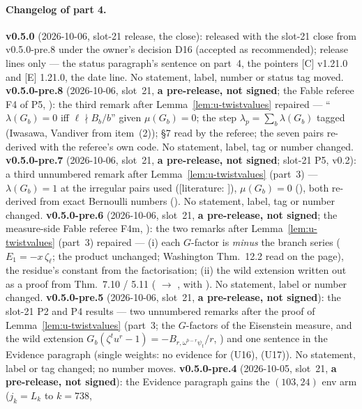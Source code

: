 \documentclass[11pt]{article}
\newcommand{\LIT}[1]{\textsf{[literature: #1]}}   %
\begin{document}
\paragraph{Changelog of part 4.} \textbf{v0.5.0} (2026-10-06, slot-21 release, the close): released with the slot-21 close from v0.5.0-pre.8 under the owner's decision D16
(accepted as recommended); release lines only --- the status paragraph's sentence on part~4, the pointers [C] v1.21.0 and [E] 1.21.0, the date line. No statement, label, number or status tag moved.
\textbf{v0.5.0-pre.8} (2026-10-06, slot~21, \textbf{a pre-release, not signed}; the Fable referee F4 of P5, ):
the third remark after Lemma~\ref{lem:u-twistvalues} repaired --- ``$\lambda(G_b)=0$ iff $\ell\nmid B_b/b$'' \PROVED{} given $\mu(G_b)=0$; the step $\lambda_p=\sum_b\lambda(G_b)$ tagged \STD{} (Iwasawa, Vandiver
from \cite{hho} item~(2)); \cite{hho} \S7 read by the referee; the seven pairs re-derived with the referee's own code. No statement, label, tag or number changed.
\textbf{v0.5.0-pre.7} (2026-10-06, slot~21, \textbf{a pre-release, not signed}; slot-21 P5,  v0.2): a third
unnumbered remark after Lemma~\ref{lem:u-twistvalues} (part~3) --- $\lambda(G_b)=1$ at the irregular pairs used (\LIT{\cite{hho}}), $\mu(G_b)=0$ (), both
re-derived from exact Bernoulli numbers (\COMP). No statement, label, tag or number changed. \textbf{v0.5.0-pre.6} (2026-10-06, slot~21, \textbf{a pre-release, not signed}; the measure-side Fable referee F4m,
): the two remarks after Lemma~\ref{lem:u-twistvalues} (part~3) repaired --- (i) each $G$-factor is \emph{minus} the branch
series ($E_1=-x\,\zeta_\ell$; the product unchanged; Washington Thm.~12.2 read on the page), the residue's constant \PROVED{} from the factorisation; (ii) the wild extension written out as a proof
from Thm.~7.10 / 5.11 (\COMP{} $\to$ \PROVED, with \COMP). No statement, label or number changed. \textbf{v0.5.0-pre.5} (2026-10-06, slot~21, \textbf{a pre-release, not signed}): the slot-21 P2 and P4 results --- two unnumbered remarks after the proof of
Lemma~\ref{lem:u-twistvalues} (part~3; the $G$-factors of the Eisenstein measure, and the wild extension $G_b(\zeta^{t}u^{r}-1)=-B_{r,\omega^{b-r}\psi_t}/r$, \COMP) and one sentence in the Evidence
paragraph (single weights: no evidence for (U16), (U17)). No statement, label or tag changed; no number moves. \textbf{v0.5.0-pre.4} (2026-10-05, slot~21, \textbf{a pre-release, not signed}): the Evidence paragraph gains the $(103,24)$ env arm ($j_k=L_k$ to $k=738$,
\end{document}
